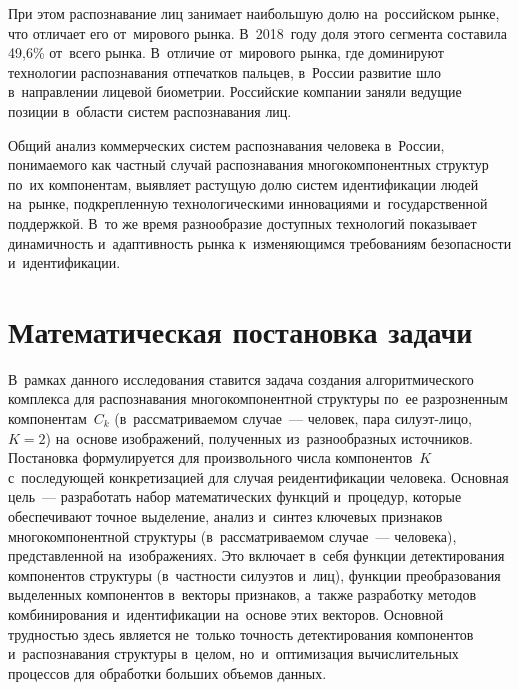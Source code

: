 При этом распознавание лиц занимает наибольшую долю на~российском рынке,
что отличает его от~мирового рынка. В~2018~году
доля этого сегмента составила 49,6\% от~всего рынка. В~отличие
от~мирового рынка, где доминируют технологии распознавания отпечатков пальцев, в~России
развитие шло в~направлении лицевой биометрии. Российские компании заняли
ведущие позиции в~области систем распознавания лиц.

Общий анализ коммерческих систем распознавания человека в~России, понимаемого как частный случай распознавания многокомпонентных структур по~их компонентам, выявляет
растущую долю систем идентификации людей на~рынке, подкрепленную
технологическими инновациями и~государственной поддержкой. В~то же время
разнообразие доступных технологий показывает динамичность и~адаптивность
рынка к~изменяющимся требованиям безопасности и~идентификации.

\section{Математическая постановка задачи}\label{sec:ch1/math}

В~рамках данного исследования ставится задача создания алгоритмического
комплекса для распознавания многокомпонентной структуры по~ее разрозненным компонентам~$C_k$ (в~рассматриваемом случае~--- человек, пара силуэт-лицо, $K=2$) на~основе
изображений, полученных из~разнообразных источников. Постановка формулируется для произвольного числа компонентов~$K$ с~последующей конкретизацией для случая реидентификации человека. Основная цель~---
разработать набор математических функций и~процедур, которые обеспечивают
точное выделение, анализ и~синтез ключевых признаков многокомпонентной структуры (в~рассматриваемом случае~--- человека),
представленной на~изображениях. Это включает в~себя функции
детектирования компонентов структуры (в~частности силуэтов и~лиц), функции преобразования выделенных компонентов
в~векторы признаков, а~также разработку методов комбинирования
и~идентификации на~основе этих векторов. Основной трудностью здесь является
не~только точность детектирования компонентов и~распознавания структуры в~целом, но~и~оптимизация
вычислительных процессов для обработки больших объемов данных.

